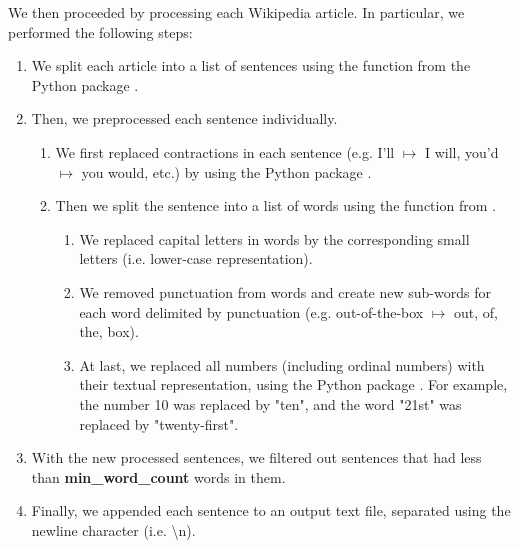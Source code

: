 We then proceeded by processing each Wikipedia article. In particular, we performed the following steps:
\begin{enumerate}
    \item We split each article into a list of sentences using the  function from the  Python package \cite{bird2009natural}.
    \item Then, we preprocessed each sentence individually.
    \begin{enumerate}
        \item We first replaced contractions in each sentence (e.g. I'll $\mapsto$ I will, you'd $\mapsto$ you would, etc.) by using the  Python package \cite{contractions-2016}.
        \item Then we split the sentence into a list of words using the  function from .
        \begin{enumerate}
            \item We replaced capital letters in words by the corresponding small letters (i.e. lower-case representation).
            \item We removed punctuation from words and create new sub-words for each word delimited by punctuation (e.g. out-of-the-box $\mapsto$ out, of, the, box).
            \item At last, we replaced all numbers (including ordinal numbers) with their textual representation, using the  Python package \cite{num2words2014}. For example, the number 10 was replaced by "ten", and the word "21st" was replaced by "twenty-first".
        \end{enumerate}
    \end{enumerate}
    \item With the new processed sentences, we filtered out sentences that had less than \textbf{min\_word\_count} words in them.
    \item Finally, we appended each sentence to an output text file, separated using the newline character (i.e. \textbackslash n).
\end{enumerate}

